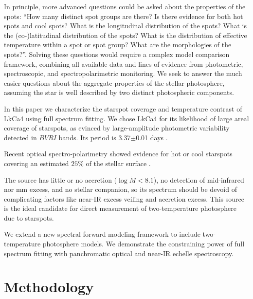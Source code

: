 \documentclass[onecolumn]{emulateapj}%
\newcommand{\name}{LkCa4 }
\begin{document}

In principle, more advanced questions could be asked about the properties of the spots: ``How many distinct spot groups are there?  Is there evidence for both hot spots and cool spots?  What is the longitudinal distribution of the spots?  What is the (co-)latitudinal distribution of the spots?  What is the distribution of effective temperature within a spot or spot group?  What are the morphologies of the spots?''.  Solving these questions would require a complex model comparison framework, combining all available data and lines of evidence from photometric, spectroscopic, and spectropolarimetric monitoring.  We seek to answer the much easier questions about the aggregate properties of the stellar photosphere, assuming the star is well described by two distinct photospheric components.  


In this paper we characterize the starspot coverage and temperature contrast of \name using full spectrum fitting.  We chose \name for its likelihood of large areal coverage of starspots, as evinced by large-amplitude photometric variability  detected in $BVRI$ bands.  Its period is 3.37$\pm$0.01 days \citep{1993AJ....106.1608V,1994IBVS.4042....1G,grankin08,xiao12}.  

Recent optical spectro-polarimetry showed evidence for hot or cool starspots covering an estimated $25\%$ of the stellar surface \citep{2014MNRAS.444.3220D}.  

The source has little or no accretion ($\log{\dot M} < 8.1$), no detection of mid-infrared nor mm excess, and no stellar companion, so its spectrum should be devoid of complicating factors like near-IR excess veiling and accretion excess.  This source is the ideal candidate for direct measurement of two-temperature photosphere due to starspots.

We extend a new spectral forward modeling framework to include two-temperature photosphere models.  We demonstrate the constraining power of full spectrum fitting with panchromatic optical and near-IR echelle spectroscopy.


\section{Methodology}\label{sec:methods} 
\end{document}
